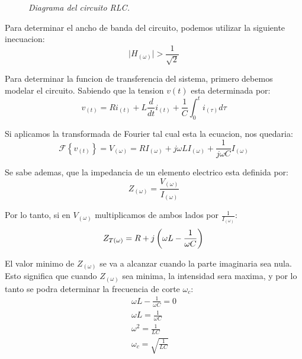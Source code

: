 \documentclass[a4paper,12pt]{report}
\begin{document}
\begin{enumerate}[label=\alph*), left=0pt]
\begin{figure}[h]
                    \textit{Diagrama del circuito RLC.}
                \end{figure}

                Para determinar el ancho de banda del circuito, podemos utilizar la siguiente inecuacion:
                \begin{equation}
                    \label{ancho.de.banda}
                    \lvert H_{(\omega)} \rvert > \frac{1}{\sqrt{2}}
                \end{equation}

                Para determinar la funcion de transferencia del sistema, primero debemos modelar el circuito. Sabiendo
                que la tension $v(t)$ esta determinada por:
                \begin{equation*}
                    v_{(t)} = Ri_{(t)} + L \frac{d}{dt} i_{(t)} + \frac{1}{C} \int_{0}^{t} i_{(\tau)} d\tau
                \end{equation*}

                Si aplicamos la transformada de Fourier tal cual esta la ecuacion, nos quedaria:
                \begin{equation*}
                    \mathcal{F} \left\{ v_{(t)} \right\} = V_{(\omega)} = R I_{(\omega)} + j \omega L I_{(\omega)} +
                        \frac{1}{j \omega C} I_{(\omega)}
                \end{equation*}

                Se sabe ademas, que la impedancia de un elemento electrico esta definida por:
                \begin{equation}
                    \label{impedancia}
                    Z_{(\omega)} = \frac{V_{(\omega)}}{I_{(\omega)}}
                \end{equation}

                Por lo tanto, si en $V_{(\omega)}$ multiplicamos de ambos lados por $\frac{1}{I_{(\omega)}}$:
                \begin{equation*}
                    Z_{T(\omega)} = R + j \left(\omega L - \frac{1}{\omega C}\right)\\
                \end{equation*}

                El valor minimo de $Z_{(\omega)}$ se va a alcanzar cuando la parte imaginaria sea nula. Esto significa
                que cuando $Z_{(\omega)}$ sea minima, la intensidad sera maxima, y por lo tanto se podra determinar la
                frecuencia de corte $\omega_c$:
                \begin{gather*}
                    \omega L - \frac{1}{\omega C} = 0\\
                    \omega L = \frac{1}{\omega C}\\
                    \omega^2 = \frac{1}{LC}\\
                    \omega_c = \sqrt{\frac{1}{LC}}
                \end{gather*}


\end{enumerate}
\end{document}
